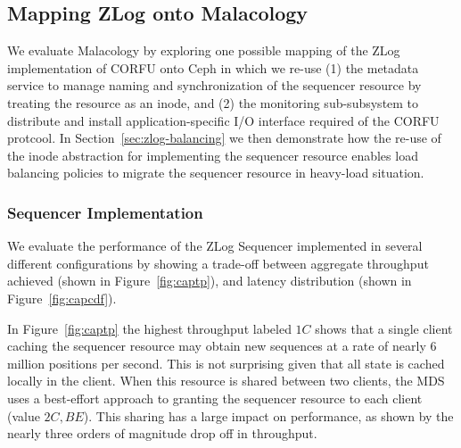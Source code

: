 \documentclass[preprint]{sigplanconf-eurosys}
\begin{document}

\subsection{Mapping ZLog onto Malacology}
\label{sec:mapping-zlog-onto-malacology}

We evaluate Malacology by exploring one possible mapping of the ZLog
implementation of CORFU onto Ceph in which we re-use (1) the metadata service
to manage naming and synchronization of the sequencer resource by treating the
resource as an inode, and (2) the monitoring sub-subsystem to distribute and
install application-specific I/O interface required of the CORFU protcool. In
Section~\ref{sec:zlog-balancing} we then demonstrate how the re-use of the inode
abstraction for implementing the sequencer resource enables load balancing policies
to migrate the sequencer resource in heavy-load situation.

\subsubsection{Sequencer Implementation}
\label{sec:sequencer-implementation}

We evaluate the performance of the ZLog Sequencer implemented in several
different configurations by showing a trade-off between aggregate throughput
achieved (shown in Figure~\ref{fig:captp}), and latency distribution (shown in
Figure~\ref{fig:capcdf}).

In Figure~\ref{fig:captp} the highest throughput labeled $1C$ shows that a
single client caching the sequencer resource may obtain new sequences at a rate
of nearly 6 million positions per second. This is not surprising given that all
state is cached locally in the client. When this resource is shared between two
clients, the MDS uses a best-effort approach to granting the sequencer resource
to each client (value $2C,BE$). This sharing has a large impact on performance,
as shown by the nearly three orders of magnitude drop off in throughput.
\end{document}
